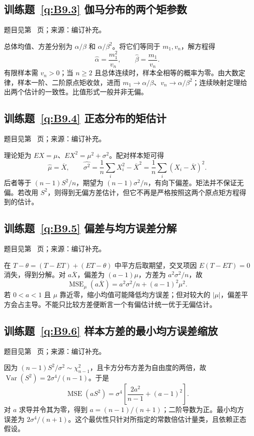 \documentclass[UTF8,12pt,a4paper,fontset=fandol]{ctexbook}
\begin{document}
\subsection*{训练题~\ref{q:B9.3} 伽马分布的两个矩参数}\label{a:B9.3}{\small 题目见第~\pageref{q:B9.3} 页；来源：编订补充。}
\begin{solve}总体均值、方差分别为 $\alpha/\beta$ 和 $\alpha/\beta^2$。将它们等同于 $m_1,v_n$，解方程得\[\widehat\alpha=\frac{m_1^2}{v_n},\qquad\widehat\beta=\frac{m_1}{v_n}.\]有限样本需 $v_n>0$；当 $n\ge2$ 且总体连续时，样本全相等的概率为零。由大数定律，样本一阶、二阶原点矩收敛，进而 $m_1\to\alpha/\beta$、$v_n\to\alpha/\beta^2$；连续映射定理给出两个估计的一致性。比值形式一般并非无偏。\end{solve}

\subsection*{训练题~\ref{q:B9.4} 正态分布的矩估计}\label{a:B9.4}{\small 题目见第~\pageref{q:B9.4} 页；来源：编订补充。}
\begin{solve}理论矩为 $EX=\mu$、$EX^2=\mu^2+\sigma^2$。配对样本矩可得\[\widehat\mu=\overline X,\qquad\widehat{\sigma^2}=\frac1n\sum_iX_i^2-\overline X^2=\frac1n\sum_i(X_i-\overline X)^2.\]后者等于 $(n-1)S^2/n$，期望为 $(n-1)\sigma^2/n$，有向下偏差。矩法并不保证无偏。若改用 $S^2$，则得到无偏方差估计，但它不再是严格按照这两个原点矩方程得到的估计。\end{solve}

\subsection*{训练题~\ref{q:B9.5} 偏差与均方误差分解}\label{a:B9.5}{\small 题目见第~\pageref{q:B9.5} 页；来源：编订补充。}
\begin{solve}在 $T-\theta=(T-ET)+(ET-\theta)$ 中平方后取期望，交叉项因 $E(T-ET)=0$ 消失，得到分解。对 $a\overline X$，偏差为 $(a-1)\mu$，方差为 $a^2\sigma^2/n$，故\[\operatorname{MSE}_\mu(a\overline X)=a^2\sigma^2/n+(a-1)^2\mu^2.\]若 $0<a<1$ 且 $\mu$ 靠近零，缩小均值可能降低均方误差；但对较大的 $|\mu|$，偏差平方会占主导。不能只比较方差便断言一个有偏估计统一优于无偏估计。\end{solve}

\subsection*{训练题~\ref{q:B9.6} 样本方差的最小均方误差缩放}\label{a:B9.6}{\small 题目见第~\pageref{q:B9.6} 页；来源：编订补充。}
\begin{solve}因为 $(n-1)S^2/\sigma^2\sim\chi^2_{n-1}$，且卡方分布方差为自由度的两倍，故 $\operatorname{Var}(S^2)=2\sigma^4/(n-1)$。于是\[\operatorname{MSE}(aS^2)=\sigma^4\left[\frac{2a^2}{n-1}+(a-1)^2\right].\]对 $a$ 求导并令其为零，得到 $a=(n-1)/(n+1)$；二阶导数为正。最小均方误差为 $2\sigma^4/(n+1)$。这个最优性只针对所指定的常数倍估计量类，且依赖正态假设。\end{solve}
\end{document}
